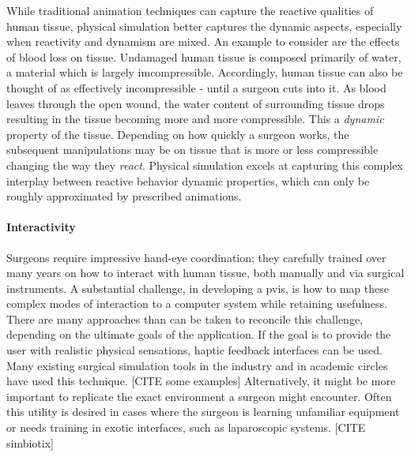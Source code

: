 \documentclass[12pt,oneside,letterpaper]{memoir}
\begin{document}
While traditional animation techniques can capture the reactive
qualities of human tissue, physical simulation better captures the
dynamic aspects, especially when reactivity and dynamism are mixed. An
example to consider are the effects of blood loss on tissue. Undamaged
human tissue is composed primarily of water, a material which is
largely imcompressible. Accordingly, human tissue can also be thought
of as effectively incompressible - until a surgeon cuts into it. As
blood leaves through the open wound, the water content of surrounding
tissue drops resulting in the tissue becoming more and more
compressible. This a \textit{dynamic} property of the
tissue. Depending on how quickly a surgeon works, the subsequent
manipulations may be on tissue that is more or less compressible
changing the way they \textit{react}. Physical simulation excels at
capturing this complex interplay between reactive behavior dynamic
properties, which can only be roughly approximated by prescribed animations.

\paragraph{Interactivity} Surgeons require impressive hand-eye
coordination; they carefully trained over many years on how to
interact with human tissue, both manually and via surgical
instruments. A substantial challenge, in developing a \gls{pvis}, is
how to map these complex modes of interaction to a computer system
while retaining usefulness. There are many approaches than can be
taken to reconcile this challenge, depending on the ultimate goals of
the application. If the goal is to provide the user with realistic
physical sensations, haptic feedback interfaces can be used. Many
existing surgical simulation tools in the industry and in academic
circles have used this technique. [CITE some examples] Alternatively,
it might be more important to replicate the exact environment a
surgeon might encounter. Often this utility is desired in cases where
the surgeon is learning unfamiliar equipment or needs training in
exotic interfaces, such as laparoscopic systems. [CITE simbiotix]
\end{document}
